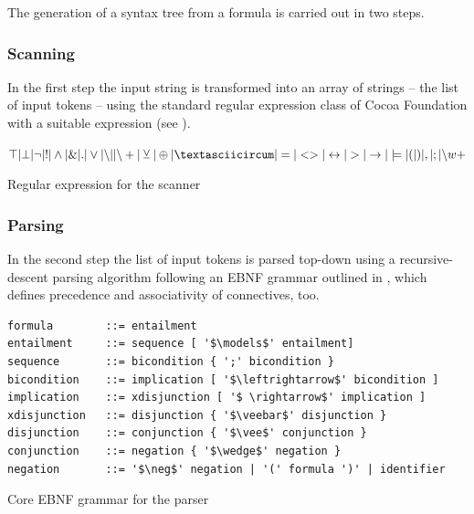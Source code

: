 The generation of a syntax tree from a formula  is carried out in two steps. 

\subsubsection{Scanning}

In the first step the input string is transformed into an array of strings – the list of input tokens –
using the standard regular expression class of Cocoa Foundation with a suitable expression (see ).
\begin{table}[htdp]
\begin{center}
$\top | \bot 
| \neg | !
| \wedge | \& | .
| \vee | {\setminus}| | {\setminus}+ 
| \veebar | \oplus | \textasciicircum
| = | <> | \leftrightarrow 
| > | \rightarrow | \models
| ( | ) | , | ; 
| {\setminus}w+$ 
\caption{Regular expression for the scanner}
\label{tab:REGEX}
\end{center}
\end{table}


\subsubsection{Parsing}

In the second step the list of input tokens is parsed top-down 
using a recursive-descent parsing algorithm \cite[p.144ff]{Louden:1997:CCP:523017} 
following an EBNF grammar outlined in , 
which defines precedence and associativity of connectives, too.

\begin{table}[htdp]
\begin{center}
\begin{lstlisting}[mathescape]
formula        ::= entailment
entailment     ::= sequence [ '$\models$' entailment]
sequence       ::= bicondition { ';' bicondition } 
bicondition    ::= implication [ '$\leftrightarrow$' bicondition ]
implication    ::= xdisjunction [ '$ \rightarrow$' implication ]
xdisjunction   ::= disjunction { '$\veebar$' disjunction }
disjunction    ::= conjunction { '$\vee$' conjunction }
conjunction    ::= negation { '$\wedge$' negation }
negation       ::= '$\neg$' negation | '(' formula ')' | identifier
\end{lstlisting}
\caption{Core EBNF grammar for the parser}
\label{tab:CoreEBNF}
\end{center}
\end{table}

